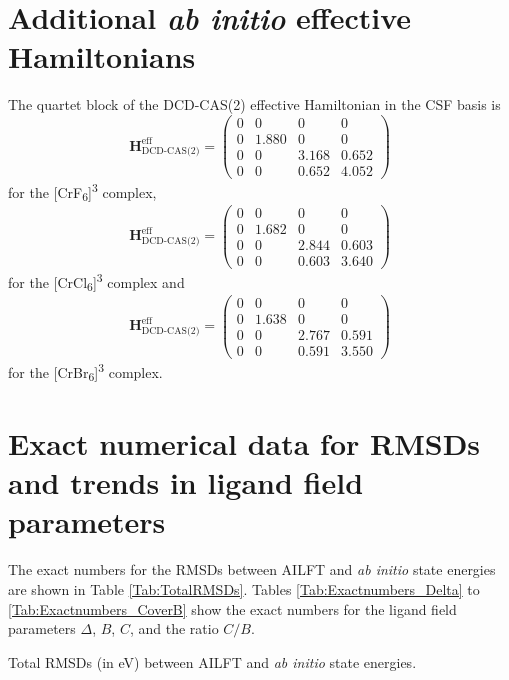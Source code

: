 \section{Additional \textit{ab initio} effective Hamiltonians}
\label{Sec:appendix_AILFT_DCDHeff}
The quartet block of the DCD-CAS(2) effective Hamiltonian in the CSF basis is
	\begin{equation}{\mathbf{H}}_{{\text{DCD-CAS(2)}}}^{{\text{eff}}} = \left( {\begin{array}{*{20}{c}}
  0&0&0&0 \\ 
  0&{1.880}&0&0 \\ 
  0&0&{3.168}&{0.652} \\ 
  0&0&{0.652}&{4.052} 
\end{array}} \right)\end{equation}
for the [CrF\textsubscript{6}]\textsuperscript{3\textminus} complex,
	\begin{equation}{\mathbf{H}}_{{\text{DCD-CAS(2)}}}^{{\text{eff}}} = \left( {\begin{array}{*{20}{c}}
  0&0&0&0 \\ 
  0&{1.682}&0&0 \\ 
  0&0&{2.844}&{0.603} \\ 
  0&0&{0.603}&{3.640} 
\end{array}} \right)\end{equation}
for the [CrCl\textsubscript{6}]\textsuperscript{3\textminus} complex and
	\begin{equation}{\mathbf{H}}_{{\text{DCD-CAS(2)}}}^{{\text{eff}}} = \left( {\begin{array}{*{20}{c}}
  0&0&0&0 \\ 
  0&{1.638}&0&0 \\ 
  0&0&{2.767}&{0.591} \\ 
  0&0&{0.591}&{3.550} 
\end{array}} \right)\end{equation}
for the [CrBr\textsubscript{6}]\textsuperscript{3\textminus} complex.

\section{Exact numerical data for RMSDs and trends in ligand field parameters}
\label{Sec:appendix_AILFT_exactnumbers}
The exact numbers for the RMSDs between AILFT and \textit{ab initio} state energies are shown in Table \ref{Tab:TotalRMSDs}. Tables \ref{Tab:Exactnumbers_Delta} to \ref{Tab:Exactnumbers_CoverB} show the exact numbers for the ligand field parameters $\Delta$, $B$, $C$, and the ratio $C/B$.
\begin{table}
\small
\centering
\ttabbox
{\caption[Total RMSDs between AILFT and \textit{ab initio} state energies.]{Total RMSDs (in eV) between AILFT and \textit{ab initio} state energies.}
\label{Tab:TotalRMSDs}}
{
}
\end{table}

